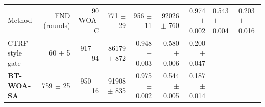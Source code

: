 \begin{tabular}{lrrrrrr}
\toprule
Method & FND (rounds) & 90 %
\midrule
WOA-C & 771 $\pm$ 29 & 956 $\pm$ 11 & 92026 $\pm$ 760 & 0.974 $\pm$ 0.002 & 0.543 $\pm$ 0.004 & 0.203 $\pm$ 0.016 \\
CTRF-style gate & 60 $\pm$ 5 & 917 $\pm$ 94 & 86179 $\pm$ 872 & 0.948 $\pm$ 0.003 & 0.580 $\pm$ 0.006 & 0.200 $\pm$ 0.047 \\
\textbf{BT-WOA-SA} & 759 $\pm$ 25 & 950 $\pm$ 16 & 91908 $\pm$ 835 & 0.975 $\pm$ 0.002 & 0.544 $\pm$ 0.005 & 0.187 $\pm$ 0.014 \\
\bottomrule
\end{tabular}